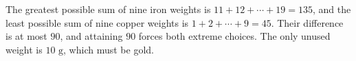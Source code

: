 The greatest possible sum of nine iron weights is $11+12+\cdots+19=135$, and the least possible sum of nine copper weights is $1+2+\cdots+9=45$. Their difference is at most $90$, and attaining $90$ forces both extreme choices. The only unused weight is $\boxed{10\text{ g}}$, which must be gold.

